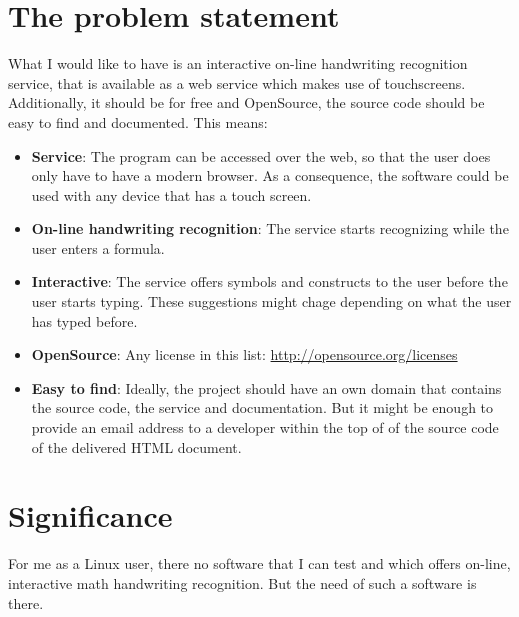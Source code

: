 \documentclass[a4paper]{scrartcl}
\begin{document}
\section{The problem statement}
    What I would like to have is an interactive on-line handwriting
    recognition service, that is available as a web service which makes
    use of touchscreens. Additionally, it should be for free and 
    OpenSource, the source code should be easy to find and documented.
    This means:
    \begin{itemize}
        \item \textbf{Service}: The program can be accessed over the web, so
              that the user does only have to have a modern browser. 
              As a consequence, the software could be used with any
              device that has a touch screen.
        \item \textbf{On-line handwriting recognition}: The service
              starts recognizing while the user enters a formula.
        \item \textbf{Interactive}: The service offers symbols and constructs
              to the user before the user starts typing. These suggestions
              might chage depending on what the user has typed before.
        \item \textbf{OpenSource}: Any license in this list: \href{http://opensource.org/licenses}{http://opensource.org/licenses}
        \item \textbf{Easy to find}: Ideally, the project should have
              an own domain that contains the source code, the service
              and documentation. But it might be enough to provide
              an email address to a developer within the top of
              of the source code of the delivered HTML document.
    \end{itemize}

\section{Significance}
For me as a Linux user, there no software that I can test and which 
offers on-line, interactive math handwriting recognition. But the
need of such a software is there.
\end{document}

